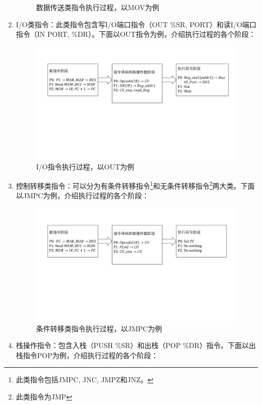 \documentclass[titlepage, 11pt]{article}
\begin{document}
\begin{enumerate}
\begin{figure}[H]
			\caption{数据传送类指令执行过程，以MOV为例}
		\end{figure}
		\item I/O类指令：此类指令包含写I/O端口指令（OUT \%SR, PORT）和读I/O端口指令（IN PORT, \%DR）。下面以OUT指令为例，介绍执行过程的各个阶段：
		\begin{figure}[H]
			\centering
			\includegraphics[scale=0.5]{6.pdf}
			\caption{I/O指令执行过程，以OUT为例}
		\end{figure}
		\item 控制转移类指令：可以分为有条件转移指令\footnote{此类指令包括JMPC, JNC, JMPZ和JNZ。}和无条件转移指令\footnote{此类指令为JMP}两大类。下面以JMPC为例，介绍执行过程的各个阶段：
		\begin{figure}[H]
			\centering
			\includegraphics[scale=0.5]{7.pdf}
			\caption{条件转移类指令执行过程，以JMPC为例}
		\end{figure}
		\item 栈操作指令：包含入栈（PUSH \%SR）和出栈（POP \%DR）指令。下面以出栈指令POP为例，介绍执行过程的各个阶段：
		\begin{figure}[H]
			\centering

\end{figure}
\end{enumerate}
\end{document}
